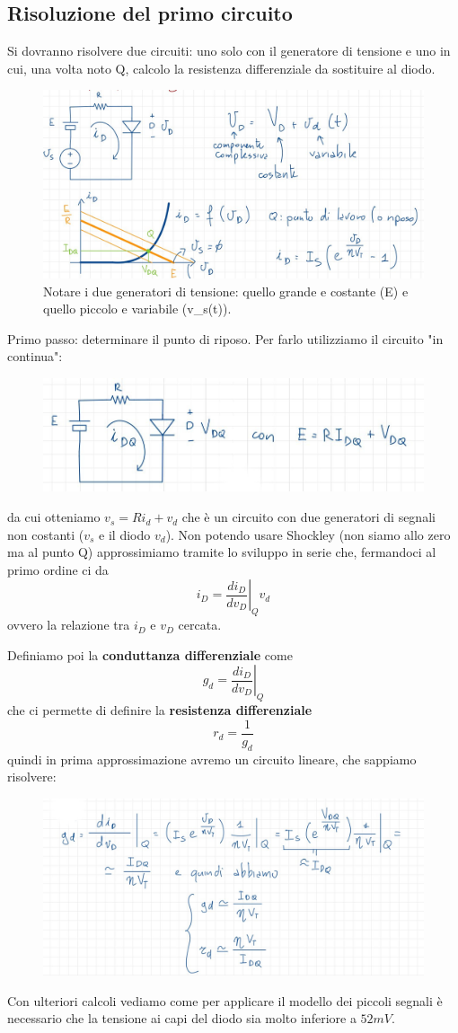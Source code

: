\documentclass[11pt,a4paper,]{article}
\begin{document}
\subsection{Risoluzione del primo circuito}
Si dovranno risolvere due circuiti: uno solo con il generatore di tensione e uno in cui, una volta noto Q, calcolo la resistenza differenziale da sostituire al diodo.
\begin{figure}[H]
    \centering
    \includegraphics[width=0.5\linewidth]{img/circ pic segn.png}
    \caption{Notare i due generatori di tensione: quello grande e costante (E) e quello piccolo e variabile (v\_s(t)).}
\end{figure}
Primo passo: determinare il punto di riposo.
Per farlo utilizziamo il circuito "in continua":
\begin{figure}[H]
    \centering
    \includegraphics[width=0.35\linewidth]{img/circ in cont.png}
\end{figure}
da cui otteniamo $v_s=Ri_d+v_d$ che è un circuito con due generatori di segnali non costanti ($v_s$ e il diodo $v_d$).
Non potendo usare Shockley (non siamo allo zero ma al punto Q) approssimiamo tramite lo sviluppo in serie che, fermandoci al primo ordine ci da
\[
i_D = \left.\frac{di_D}{dv_D}\right|_{Q}v_d
\] ovvero la relazione tra $i_D$ e $v_D$ cercata.

Definiamo poi la \textbf{conduttanza differenziale} come
\[
g_d = \left.\frac{di_D}{dv_D}\right|_Q
\]
che ci permette di definire la \textbf{resistenza differenziale}
\[
r_d = \frac{1}{g_d}
\]
quindi in prima approssimazione avremo un circuito lineare, che sappiamo risolvere:
\begin{figure}[H]
    \centering
    \includegraphics[width=0.5\linewidth]{img/ris circ app.png}
\end{figure}
Con ulteriori calcoli vediamo come per applicare il modello dei piccoli segnali è necessario che la tensione ai capi del diodo sia molto inferiore a $52mV$.
\end{document}
